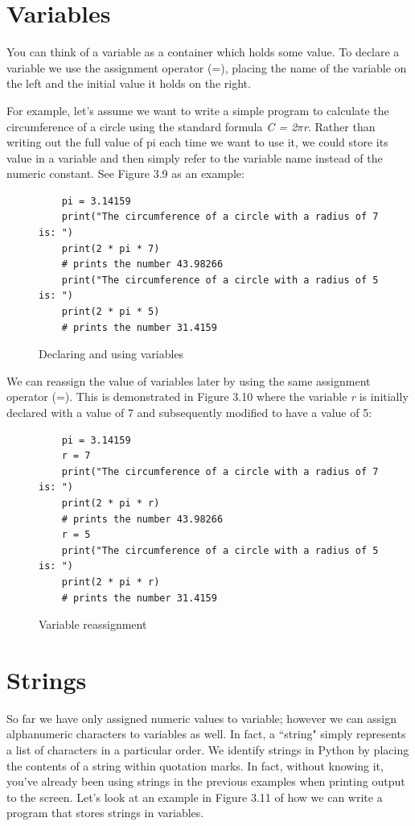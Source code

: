 \documentclass{book}
\begin{document}
\section{Variables}
You can think of a variable as a container which holds some value. To declare a variable we use the assignment operator (=), placing the name of the variable on the left and the initial value it holds on the right.

For example, let's assume we want to write a simple program to calculate the circumference of a circle using the standard formula \textit{C = 2$\pi$r}. Rather than writing out the full value of pi each time we want to use it, we could store its value in a variable and then simply refer to the variable name instead of the numeric constant. See Figure 3.9 as an example:

\begin{figure}[h]
	\caption{Declaring and using variables}
	\begin{lstlisting}
	pi = 3.14159
	print("The circumference of a circle with a radius of 7 is: ")
	print(2 * pi * 7)
	# prints the number 43.98266
	print("The circumference of a circle with a radius of 5 is: ")
	print(2 * pi * 5)
	# prints the number 31.4159
	\end{lstlisting}
\end{figure}

We can reassign the value of variables later by using the same assignment operator (=). This is demonstrated in Figure 3.10 where the variable \textit{r} is initially declared with a value of 7 and subsequently modified to have a value of 5:

\begin{figure}[h]
	\caption{Variable reassignment}
	\begin{lstlisting}
	pi = 3.14159
	r = 7
	print("The circumference of a circle with a radius of 7 is: ")
	print(2 * pi * r)
	# prints the number 43.98266
	r = 5
	print("The circumference of a circle with a radius of 5 is: ")
	print(2 * pi * r)
	# prints the number 31.4159
	\end{lstlisting}
\end{figure}

\section{Strings}

So far we have only assigned numeric values to variable; however we can assign alphanumeric characters to variables as well. In fact, a ``string" simply represents a list of characters in a particular order. We identify strings in Python by placing the contents of a string within quotation marks. In fact, without knowing it, you've already been using strings in the previous examples when printing output to the screen. Let's look at an example in Figure 3.11 of how we can write a program that stores strings in variables.
\end{document}
